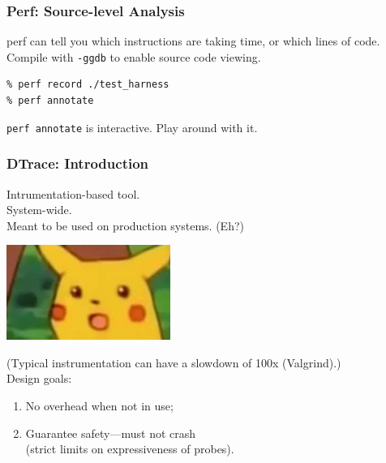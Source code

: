 \begin{frame}[fragile]
  \frametitle{Perf: Source-level Analysis}



\begin{changemargin}{1.5cm}
perf can tell you which instructions are taking time, or which lines of code.\\[1em]

Compile with {\tt -ggdb} to enable source code viewing.

\begin{lstlisting}
% perf record ./test_harness
% perf annotate
\end{lstlisting}

{\tt perf annotate} is interactive. Play around with it.
\end{changemargin}

\end{frame}

\begin{frame}
  \frametitle{DTrace: Introduction}


\begin{changemargin}{1.5cm}


    Intrumentation-based tool.\\
    System-wide.\\
    Meant to be used on production systems. (Eh?)\\[1em]
    
    \begin{center}
	\includegraphics[width=0.4\textwidth]{images/pikachu.jpeg}
	\end{center}
    
   
     {\small (Typical instrumentation can have a slowdown of 100x (Valgrind).)}\\
     Design goals:\\
\begin{enumerate} 
\item No overhead when not in use;
\item Guarantee safety---must not crash\\ \qquad (strict limits on expressiveness of probes).
\end{enumerate}

     \end{changemargin}
\end{frame}

